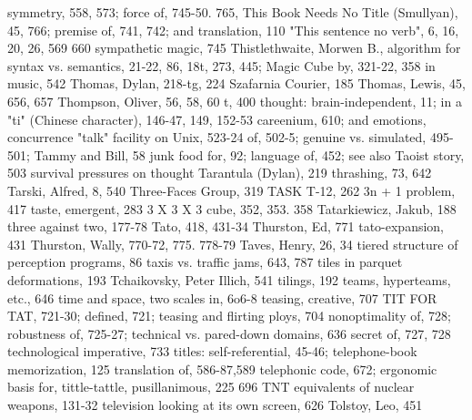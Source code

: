 symmetry, 558, 573; force of, 745-50. 765,        This Book Needs No Title (Smullyan), 45,
766; premise of, 741, 742; and translation,       110 "This sentence no verb", 6, 16, 20, 26,
569                                                 660
sympathetic magic, 745                            Thistlethwaite, Morwen B., algorithm for
syntax vs. semantics, 21-22, 86, 18t, 273, 445;     Magic Cube by, 321-22, 358
 in music, 542                                    Thomas, Dylan, 218-tg, 224
Szafarnia Courier, 185                            Thomas, Lewis, 45, 656, 657
                                                  Thompson, Oliver, 56, 58, 60
t, 400                                            thought: brain-independent, 11; in a
"ti" (Chinese character), 146-47, 149, 152-53       careenium, 610; and emotions, concurrence
"talk" facility on Unix, 523-24                     of, 502-5; genuine vs. simulated, 495-501;
Tammy and Bill, 58                                  junk food for, 92; language of, 452; see also
Taoist story, 503                                   survival pressures on thought
Tarantula (Dylan), 219                            thrashing, 73, 642
Tarski, Alfred, 8, 540                            Three-Faces Group, 319
TASK T-12, 262                                    3n + 1 problem, 417
taste, emergent, 283                              3 X 3 X 3 cube, 352, 353. 358
Tatarkiewicz, Jakub, 188                          three against two, 177-78
Tato, 418, 431-34                                 Thurston, Ed, 771
tato-expansion, 431                               Thurston, Wally, 770-72, 775. 778-79
Taves, Henry, 26, 34                              tiered structure of perception programs, 86
taxis vs. traffic jams, 643, 787                  tiles in parquet deformations, 193
Tchaikovsky, Peter Illich, 541                    tilings, 192
teams, hyperteams, etc., 646                      time and space, two scales in, 6o6-8
teasing, creative, 707                            TIT FOR TAT, 721-30; defined, 721;
teasing and flirting ploys, 704                     nonoptimality of, 728; robustness of, 725-27;
technical vs. pared-down domains, 636               secret of, 727, 728
technological imperative, 733                     titles: self-referential, 45-46;
telephone-book memorization, 125                  translation of, 586-87,589
telephonic code, 672; ergonomic basis for,        tittle-tattle, pusillanimous, 225
  696                                             TNT equivalents of nuclear weapons, 131-32
television looking at its own screen, 626         Tolstoy, Leo, 451
